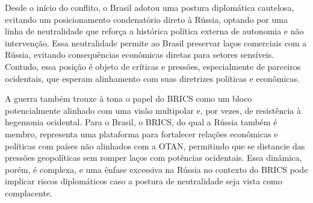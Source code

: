 \documentclass[article,12pt,oneside,a4paper,english,brazil,sumario=tradicional]{abntex2}
\begin{document}
   Desde o início do conflito, o Brasil adotou uma postura diplomática cautelosa, evitando um posicionamento condenatório direto à Rússia, optando por uma linha de neutralidade que reforça a histórica política externa de autonomia e não intervenção. Essa neutralidade permite ao Brasil preservar laços comerciais com a Rússia, evitando consequências econômicas diretas para setores sensíveis. Contudo, essa posição é objeto de críticas e pressões, especialmente de parceiros ocidentais, que esperam alinhamento com suas diretrizes políticas e econômicas.

   A guerra também trouxe à tona o papel do BRICS como um bloco potencialmente alinhado com uma visão multipolar e, por vezes, de resistência à hegemonia ocidental. Para o Brasil, o BRICS, do qual a Rússia também é membro, representa uma plataforma para fortalecer relações econômicas e políticas com países não alinhados com a OTAN, permitindo que se distancie das pressões geopolíticas sem romper laços com potências ocidentais. Essa dinâmica, porém, é complexa, e uma ênfase excessiva na Rússia no contexto do BRICS pode implicar riscos diplomáticos caso a postura de neutralidade seja vista como complacente.



\newpage

\postextual






\end{document}
